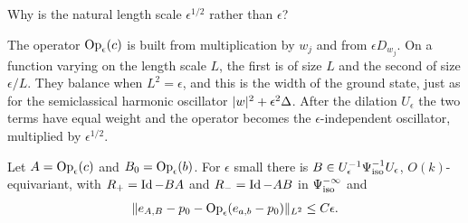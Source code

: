 \begin{question}
  Why is the natural length scale $\epsilon^{1/2}$ rather than $\epsilon$?
\end{question}
\begin{answer}
  The operator $\operatorname{Op}_\epsilon(c)$ is built from multiplication by $w_j$ and from
  $\epsilon D_{w_j}$. On a function varying on the length scale $L$, the first is of
  size $L$ and the second of size $\epsilon/L$. They balance when $L^2=\epsilon$,
  and this is the width of the ground state, just as for the semiclassical
  harmonic oscillator $\lvert w\rvert^2+\epsilon^2\Delta$. After the dilation $U_\epsilon$
  the two terms have equal weight and the operator becomes the $\epsilon$-independent
  oscillator, multiplied by $\epsilon^{1/2}$.
\end{answer}

\begin{lemma}\label{scindex:lem:thom-parametrix}
  Let $A=\operatorname{Op}_\epsilon(c)$ and $B_0=\operatorname{Op}_\epsilon(b)$. For $\epsilon$ small there is
  $B\in U_\epsilon^{-1}\Psi^{-1}_{\mathrm{iso}}U_\epsilon$, $O(k)$-equivariant, with
  $R_+=\operatorname{Id}-BA$ and $R_-=\operatorname{Id}-AB$ in $\Psi^{-\infty}_{\mathrm{iso}}$ and
  \begin{equation*}
    \lVert e_{A,B}-p_0-\operatorname{Op}_\epsilon(e_{a,b}-p_0)\rVert_{L^2}\le C\epsilon.
  \end{equation*}
\end{lemma}
